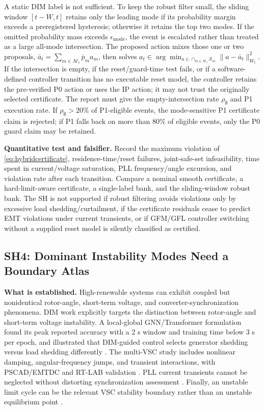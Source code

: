 \documentclass[conference]{IEEEtran}
\newcommand{\safe}{\mathcal{S}}
\begin{document}
A static DIM label is not sufficient. To keep the robust filter small, the sliding window $[t-W,t]$ retains only the leading mode if its probability margin exceeds a preregistered hysteresis; otherwise it retains the top two modes. If the omitted probability mass exceeds $\epsilon_{\mathrm{mode}}$, the event is escalated rather than treated as a large all-mode intersection. The proposed action mixes those one or two proposals, $\bar a_t=\sum_{m\in\mathcal M_t}\bar p_m a_m$, then solves $a_t\in\arg\min_{a\in\cap_{m\in\mathcal M_t}\safe_m}\|a-\bar a_t\|_{W_t}^{2}$. If the intersection is empty, if the reset/guard-time test fails, or if a software-defined controller transition has no executable reset model, the controller retains the pre-verified P0 action or uses the IP action; it may not trust the originally selected certificate. The report must give the empty-intersection rate $\rho_{\emptyset}$ and P1 execution rate. If $\rho_{\emptyset}>20\%$ of P1-eligible events, the mode-sensitive P1 certificate claim is rejected; if P1 falls back on more than 80\% of eligible events, only the P0 guard claim may be retained.

\textbf{Quantitative test and falsifier.} Record the maximum violation of \eqref{eq:hybridcertificate}, residence-time/reset failures, joint-safe-set infeasibility, time spent in current/voltage saturation, PLL frequency/angle excursion, and violation rate after each transition. Compare a nominal smooth certificate, a hard-limit-aware certificate, a single-label bank, and the sliding-window robust bank. The SH is not supported if robust filtering avoids violations only by excessive load shedding/curtailment, if the certificate residuals cease to predict EMT violations under current transients, or if GFM/GFL controller switching without a supplied reset model is silently classified as certified.

\subsection{SH4: Dominant Instability Modes Need a Boundary Atlas}

\textbf{What is established.} High-renewable systems can exhibit coupled but nonidentical rotor-angle, short-term voltage, and converter-synchronization phenomena. DIM work explicitly targets the distinction between rotor-angle and short-term voltage instability. A local-global GNN/Transformer formulation found its peak reported accuracy with a 2 s window and training time below 3 s per epoch, and illustrated that DIM-guided control selects generator shedding versus load shedding differently \cite{yao2025dim}. The multi-VSC study includes nonlinear damping, angular-frequency jumps, and transient interactions, with PSCAD/EMTDC and RT-LAB validation \cite{wang2024}. PLL current transients cannot be neglected without distorting synchronization assessment \cite{chen2020}. Finally, an unstable limit cycle can be the relevant VSC stability boundary rather than an unstable equilibrium point \cite{xu2025}.
\end{document}
